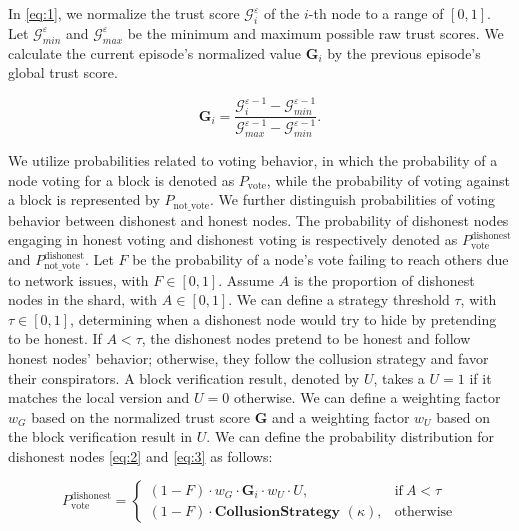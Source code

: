 In \eqref{eq:1}, we normalize the trust score $\mathcal{G}_{i}^\varepsilon$ of the $i$-th node to a range of $\left[0,1\right]$. Let $\mathcal{G}^\varepsilon_{min}$ and $\mathcal{G}^\varepsilon_{max}$ be the minimum and maximum possible raw trust scores. We calculate the current episode's normalized value $\mathbf{G}_i$ by the previous episode's global trust score.


\begin{equation}
    \label{eq:1}
    \mathbf{G}_i = \frac{\mathcal{G}_{i}^{\varepsilon-1} - \mathcal{G}_{min}^{\varepsilon-1}}{\mathcal{G}_{max}^{\varepsilon-1} - \mathcal{G}_{min}^{\varepsilon-1}}.
\end{equation} 


We utilize probabilities related to voting behavior, in which the probability of a node voting for a block is denoted as $P_\text{vote}$, while the probability of voting against a block is represented by $P_\text{not\_vote}$. We further distinguish probabilities of voting behavior between dishonest and honest nodes. The probability of dishonest nodes engaging in honest voting and dishonest voting is respectively denoted as $P_\text{vote}^\text{dishonest}$ and $P_\text{not\_vote}^\text{dishonest}$. Let $F$ be the probability of a node's vote failing to reach others due to network issues, with $F \in [0, 1]$. Assume $A$ is the proportion of dishonest nodes in the shard, with $A \in [0, 1]$. We can define a strategy threshold $\tau$, with $\tau \in [0, 1]$, determining when a dishonest node would try to hide by pretending to be honest. If $A < \tau$, the dishonest nodes pretend to be honest and follow honest nodes' behavior; otherwise, they follow the collusion strategy and favor their conspirators. A block verification result, denoted by $U$, takes a $U = 1$ if it matches the local version and $U = 0$ otherwise. We can define a weighting factor $w_G$ based on the normalized trust score $\mathbf{G}$ and a weighting factor $w_U$ based on the block verification result in $U$. We can define the probability distribution for dishonest nodes \eqref{eq:2} and \eqref{eq:3} as follows:


\begin{equation}
    P_\text{vote}^{\text{dishonest}} = 
    \begin{cases}
        (1-F) \cdot w_G \cdot \mathbf{G}_i \cdot  w_U \cdot U, & \text{if}\ A < \tau \\
        (1-F) \cdot \textbf{CollusionStrategy }(\kappa), & \text{otherwise}
    \end{cases}
    \label{eq:2}
\end{equation}

